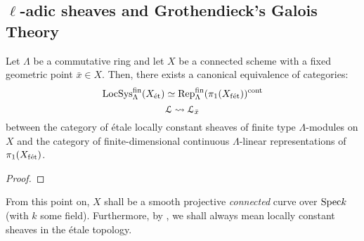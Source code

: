     \subsection{\texorpdfstring{$\ell$}{}-adic sheaves and Grothendieck's Galois Theory}
        \begin{lemma} \label{lemma: representations_of_the_etale_fundamental_group}
            Let $\Lambda$ be a commutative ring and let $X$ be a connected scheme with a fixed geometric point $\bar{x} \in X$. Then, there exists a canonical equivalence of categories:
                $$\mathrm{LocSys}_{\Lambda}^{\mathrm{fin}}(X_{\mathrm{\acute{e}t}}) \simeq \mathrm{Rep}_{\Lambda}^{\mathrm{fin}}(\pi_1(X_{\mathrm{f\acute{e}t}}))^{\mathrm{cont}}$$
                $$\mathcal{L} \leadsto \mathcal{L}_{\bar{x}}$$
            between the category of \'etale locally constant sheaves of finite type $\Lambda$-modules on $X$ and the category of finite-dimensional continuous $\Lambda$-linear representations of $\pi_1(X_{\mathrm{f\acute{e}t}})$.
        \end{lemma}
            \begin{proof}
                
            \end{proof}
    
        \begin{convention} \label{conv: base_curve}
            From this point on, $X$ shall be a smooth projective \textit{connected} curve over $\mathrm{Spec} k$ (with $k$ some field). Furthermore, by , we shall always mean locally constant sheaves in the \'etale topology.
        \end{convention}
        

